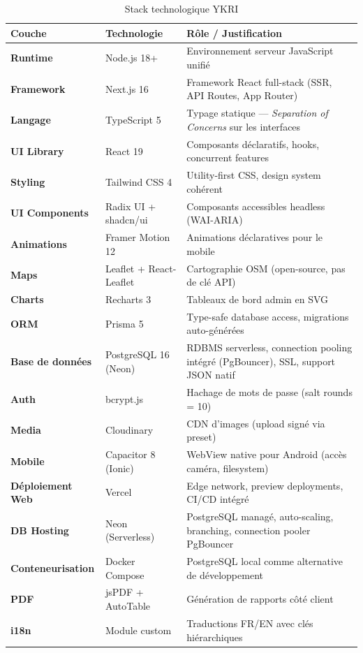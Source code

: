 \documentclass[12pt, a4paper]{article}
\begin{document}
\begin{table}[h!]
\centering
\caption{Stack technologique YKRI}
\begin{tabularx}{\textwidth}{l l X}
\toprule
\textbf{Couche} & \textbf{Technologie} & \textbf{Rôle / Justification} \\
\midrule
\textbf{Runtime}        & Node.js 18+         & Environnement serveur JavaScript unifié \\
\textbf{Framework}      & Next.js 16          & Framework React full-stack (SSR, API Routes, App Router) \\
\textbf{Langage}        & TypeScript 5        & Typage statique — \textit{Separation of Concerns} sur les interfaces \\
\textbf{UI Library}     & React 19            & Composants déclaratifs, hooks, concurrent features \\
\textbf{Styling}        & Tailwind CSS 4      & Utility-first CSS, design system cohérent \\
\textbf{UI Components}  & Radix UI + shadcn/ui & Composants accessibles headless (WAI-ARIA) \\
\textbf{Animations}     & Framer Motion 12    & Animations déclaratives pour le mobile \\
\textbf{Maps}           & Leaflet + React-Leaflet & Cartographie OSM (open-source, pas de clé API) \\
\textbf{Charts}         & Recharts 3          & Tableaux de bord admin en SVG \\
\textbf{ORM}            & Prisma 5            & Type-safe database access, migrations auto-générées \\
\textbf{Base de données} & PostgreSQL 16 (Neon) & RDBMS serverless, connection pooling intégré (PgBouncer), SSL, support JSON natif \\
\textbf{Auth}           & bcrypt.js           & Hachage de mots de passe (salt rounds = 10) \\
\textbf{Media}          & Cloudinary          & CDN d'images (upload signé via preset) \\
\textbf{Mobile}         & Capacitor 8 (Ionic) & WebView native pour Android (accès caméra, filesystem) \\
\textbf{Déploiement Web}& Vercel              & Edge network, preview deployments, CI/CD intégré \\
\textbf{DB Hosting}       & Neon (Serverless)  & PostgreSQL managé, auto-scaling, branching, connection pooler PgBouncer \\
\textbf{Conteneurisation} & Docker Compose    & PostgreSQL local comme alternative de développement \\
\textbf{PDF}            & jsPDF + AutoTable   & Génération de rapports côté client \\
\textbf{i18n}           & Module custom       & Traductions FR/EN avec clés hiérarchiques \\
\bottomrule
\end{tabularx}
\end{table}
\end{document}
